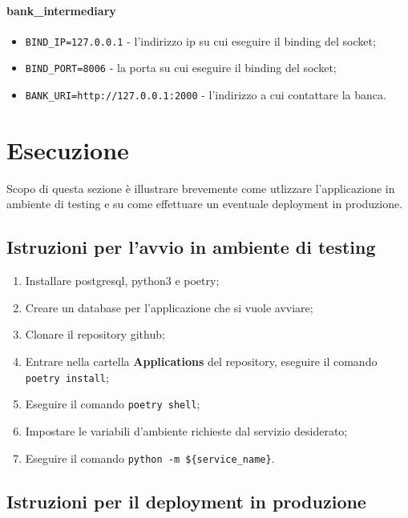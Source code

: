 \documentclass[11pt]{article} %
\begin{document}
\paragraph{bank\_intermediary}
\begin{itemize}
\item \verb|BIND_IP=127.0.0.1| - l'indirizzo ip su cui eseguire il binding del socket;
\item \verb|BIND_PORT=8006| - la porta su cui eseguire il binding del socket;
\item \verb|BANK_URI=http://127.0.0.1:2000| - l'indirizzo a cui contattare la banca.
\end{itemize}

\clearpage

\section{Esecuzione}
\label{sez:esecuzione}

Scopo di questa sezione è illustrare brevemente come utlizzare l'applicazione in ambiente di testing  e su come effettuare un eventuale deployment in produzione.

\subsection{Istruzioni per l'avvio in ambiente di testing}

\begin{enumerate}
\item Installare postgresql, python3 e poetry;
\item Creare un database per l'applicazione che si vuole avviare;
\item Clonare il repository github;
\item Entrare nella cartella \textbf{Applications} del repository, eseguire il comando\\
\verb|poetry install|;
\item Eseguire il comando \verb|poetry shell|;
\item Impostare le variabili d'ambiente richieste dal servizio desiderato;
\item Eseguire il comando \verb|python -m ${service_name}|.
\end{enumerate}

\subsection{Istruzioni per il deployment in produzione}
\end{document}
